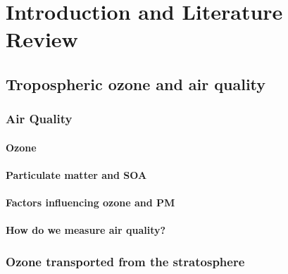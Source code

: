 
%
\chapter{Introduction and Literature Review} %
\label{LR}
  
\section{Tropospheric ozone and air quality}
  \label{LR:O3andAQ}
  \subsection{Air Quality}
    \label{LR:O3andAQ:AQ}
    
    
    \subsubsection{Ozone}
      
      
      
    
    \subsubsection{Particulate matter and SOA}
      
    
    
    \subsubsection{Factors influencing ozone and PM}
      
    \subsubsection{How do we measure air quality?}
      
      
      
      
      
  \subsection{Ozone transported from the stratosphere}
    
